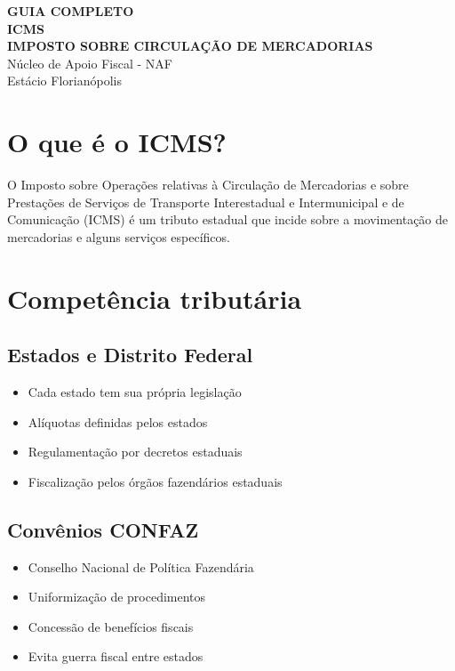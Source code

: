 \documentclass[12pt,a4paper]{article}
\begin{document}
\begin{center}
{\LARGE \textbf{GUIA COMPLETO}}\\[0.5cm]
{\Large \textbf{ICMS}}\\[0.3cm]
{\Large \textbf{IMPOSTO SOBRE CIRCULAÇÃO DE MERCADORIAS}}\\[0.5cm]
{\large Núcleo de Apoio Fiscal - NAF}\\
{\large Estácio Florianópolis}\\[1cm]
\end{center}

\section{O que é o ICMS?}

O Imposto sobre Operações relativas à Circulação de Mercadorias e sobre Prestações de Serviços de Transporte Interestadual e Intermunicipal e de Comunicação (ICMS) é um tributo estadual que incide sobre a movimentação de mercadorias e alguns serviços específicos.

\section{Competência tributária}

\subsection{Estados e Distrito Federal}
\begin{itemize}
    \item Cada estado tem sua própria legislação
    \item Alíquotas definidas pelos estados
    \item Regulamentação por decretos estaduais
    \item Fiscalização pelos órgãos fazendários estaduais
\end{itemize}

\subsection{Convênios CONFAZ}
\begin{itemize}
    \item Conselho Nacional de Política Fazendária
    \item Uniformização de procedimentos
    \item Concessão de benefícios fiscais
    \item Evita guerra fiscal entre estados
\end{itemize}
\end{document}
